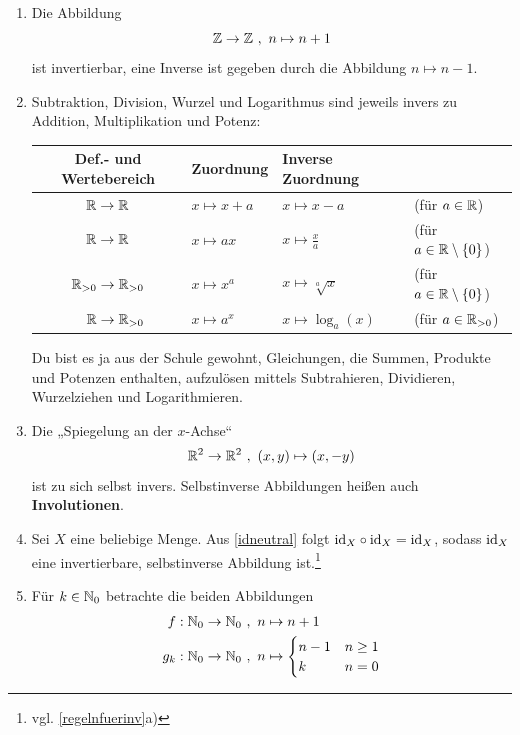 \begin{bsp} \label{bsp:umkehrabb} \qquad
    \begin{enumerate}
        \item Die Abbildung
            \[ \mathbb Z\to \mathbb Z \ ,\ n\mapsto n+1 \]
        ist invertierbar, eine Inverse ist gegeben durch die Abbildung $n\mapsto n-1$.
        \item Subtraktion, Division, Wurzel und Logarithmus sind jeweils invers zu Addition, Multiplikation und Potenz:
        \begin{center}
        \begin{tabular}{clll}
            Def.- und Wertebereich & Zuordnung & Inverse Zuordnung & \phantom{Platzhalter}\\
            \midrule
            $\mathbb R\to \mathbb R$ & $x\mapsto x+a$ & $x\mapsto x-a$ & (für $a\in \mathbb R$)\\
            $\mathbb R\to \mathbb R$ & $x\mapsto ax$ & $x\mapsto \frac{x}{a}$ & (für $a\in \mathbb R\setminus \{0\}$) \\
            $\mathbb R_{>0} \to \mathbb R_{>0}$ & $x\mapsto x^a$ & $x\mapsto \sqrt[a]{x}$ & (für $a\in \mathbb R\setminus \{0\}$) \\
            $\phantom{\R_{>0} \to \R_{>0}}\makebox[0pt][r]{$\R \to \R_{>0}$}$ & $x \mapsto a^x$ & $x \mapsto \log_a(x)$ & (für $a\in \mathbb R_{>0}$)
        \end{tabular}
        \end{center}
        Du bist es ja aus der Schule gewohnt, Gleichungen, die Summen, Produkte und Potenzen enthalten, aufzulösen mittels Subtrahieren, Dividieren, Wurzelziehen und Logarithmieren.
        \item Die „Spiegelung an der $x$-Achse“
        \[ \mathbb R^2 \to \mathbb R^2 \ ,\ (x,y) \mapsto (x,-y) \]
        ist zu sich selbst invers. Selbstinverse Abbildungen heißen auch \textbf{Involutionen}.
        \item Sei $X$ eine beliebige Menge. Aus \cref{idneutral} folgt $\mathrm{id}_X\circ \mathrm{id}_X=\mathrm{id}_X$, sodass $\mathrm{id}_X$ eine invertierbare, selbstinverse Abbildung ist.\footnote{vgl. \cref{regelnfuerinv}a)}
        \item Für $k\in \mathbb N_0$ betrachte die beiden Abbildungen
        \begin{align*}
            f:\N_0 \to \N_0 \ &,\ n \mapsto n+1 \\
            g_k: \N_0 \to \N_0\ &,\ n \mapsto \begin{cases}
                n-1 & n\ge 1 \\
                k & n=0
            \end{cases}

\end{align*}
\end{enumerate}
\end{bsp}

